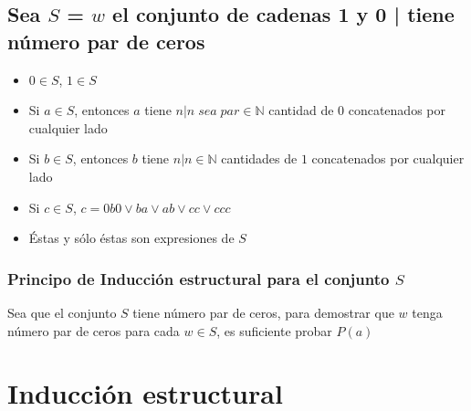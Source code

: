 \documentclass[11pt,letterpaper]{article}
\begin{document}
      \subsection{Sea $ S $ = \textbraceleft $ w $ el conjunto de cadenas 1 y 0 | tiene número par de ceros \textbraceright}

         \begin{itemize}
            \item $0 \in S $, $1  \in S $
            \item Si $ a \in S $, entonces $a$ tiene $n | n \; sea \; par \in \mathbb{N}$ cantidad de $0$ concatenados por cualquier lado
            \item Si $ b \in S $, entonces $b$ tiene $n | n \in \mathbb{N}$ cantidades de $1$ concatenados por cualquier lado
            \item Si $ c \in S $, $c = 0b0 \vee ba \vee ab \vee cc \vee ccc$
            \item Éstas y sólo éstas son expresiones de $ S $
         \end{itemize}

         \subsubsection{Principo de Inducción estructural para el conjunto $ S $}
         Sea que el conjunto $ S $ tiene número par de ceros, para demostrar que $ w $ tenga número par de ceros para cada $w \in S$, es suficiente probar $P(a)$
   \section{Inducción estructural}
\end{document}
